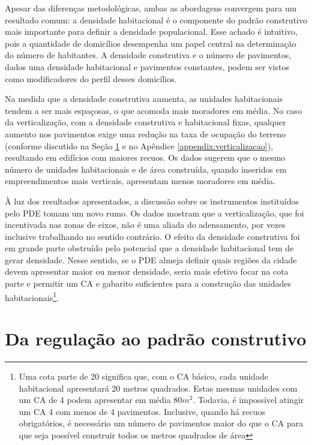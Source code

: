Apesar das diferenças metodológicas, ambas as abordagens convergem para um resultado comum: a densidade habitacional é o componente do padrão construtivo mais importante para definir a densidade populacional. Esse achado é intuitivo, pois a quantidade de domicílios desempenha um papel central na determinação do número de habitantes. A densidade construtiva e o número de pavimentos, dados uma densidade habitacional e pavimentos constantes, podem ser vistos como modificadores do perfil desses domicílios.

Na medida que a densidade construtiva aumenta, as unidades habitacionais tendem a ser mais espaçosas, o que acomoda mais moradores em média. No caso da verticalização, com a densidade construtiva e habitacional fixas, qualquer aumento nos pavimentos exige uma redução na taxa de ocupação do terreno (conforme discutido na Seção \ref{sec:perg2} e no Apêndice \ref{appendix:verticalizacao}), resultando em edifícios com maiores recuos. Os dados sugerem que o mesmo número de unidades habitacionais e de área construída, quando inseridos em empreendimentos mais verticais, apresentam menos moradores em média. 

À luz dos resultados apresentados, a discussão sobre os instrumentos instituídos pelo PDE tomam um novo rumo. Os dados mostram que a verticalização, que foi incentivada nas zonas de eixos, não é uma aliada do adensamento, por vezes inclusive trabalhando no sentido contrário. O efeito da densidade construtiva foi em grande parte obstruído pelo potencial que a densidade habitacional tem de gerar densidade. Nesse sentido, se o PDE almeja definir quais regiões da cidade devem apresentar maior ou menor densidade, seria mais efetivo focar na cota parte e permitir um CA e gabarito suficientes para a construção das unidades habitacionais\footnote{Uma cota parte de 20 significa que, com o CA básico, cada unidade habitacional apresentará 20 metros quadrados. Estas mesmas unidades com um CA de 4 podem apresentar em média 80$m^2$. Todavia, é impossível atingir um CA 4 com menos de 4 pavimentos. Inclusive, quando há recuos obrigatórios, é necessário um número de pavimentos maior do que o CA para que seja possível construir todos os metros quadrados de área}.  

\section{Da regulação ao padrão construtivo}
\label{sec:perg2}

